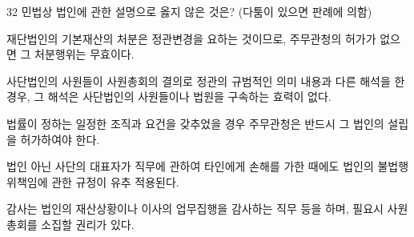 \begin{question}{32}
민법상 법인에 관한 설명으로 옳지 않은 것은? (다툼이 있으면 판례에 의함)
\begin{choices}
  \item 재단법인의 기본재산의 처분은 정관변경을 요하는 것이므로, 주무관청의 허가가 없으면 그 처분행위는 무효이다.
  \item 사단법인의 사원들이 사원총회의 결의로 정관의 규범적인 의미 내용과 다른 해석을 한 경우, 그 해석은 사단법인의 사원들이나 법원을 구속하는 효력이 없다.
  \item 법률이 정하는 일정한 조직과 요건을 갖추었을 경우 주무관청은 반드시 그 법인의 설립을 허가하여야 한다.
  \item 법인 아닌 사단의 대표자가 직무에 관하여 타인에게 손해를 가한 때에도 법인의 불법행위책임에 관한 규정이 유추 적용된다.
  \item 감사는 법인의 재산상황이나 이사의 업무집행을 감사하는 직무 등을 하며, 필요시 사원총회를 소집할 권리가 있다.
\end{choices}
\end{question}
